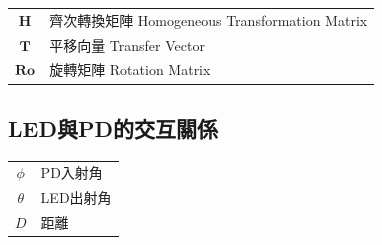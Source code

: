 \begin{longtable}[l]{cl}
    $\boldsymbol{H}$ & 齊次轉換矩陣 Homogeneous Transformation Matrix\\
    $\boldsymbol{T}$ & 平移向量 Transfer Vector\\
    $\boldsymbol{Ro}$ & 旋轉矩陣 Rotation Matrix\\
\end{longtable}




\onehalfspacing

\subsection*{LED與PD的交互關係}

\begin{longtable}[l]{cl}
    $\phi$ & PD入射角\\
    $\theta$ & LED出射角\\
    $D$&距離\\
\end{longtable}



